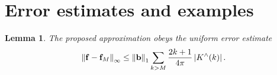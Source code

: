 \documentclass[11pt,a4paper,twoside,bibtotoc]{scrartcl}
\theoremstyle{plain}
\newtheorem{lemma}[theorem]{Lemma}
\theoremstyle{definition}
\theoremstyle{remark}
\newcommand{\abs}[1]{\ensuremath{\left\vert#1\right\vert}}
\newcommand{\fun}[2]{\ensuremath{#1{\hspace{-0.4ex}}\left(#2\right)}}
\newcommand{\mb}[1]{\mathbf{#1}}
\newcommand{\V}[1]{\mb{#1}}
\numberwithin{equation}{section}
\numberwithin{table}{section}
\numberwithin{figure}{section}
\begin{document}
\section{Error estimates and examples}\label{Basics:SphericalKernels}
\begin{lemma}\label{lemma:error}
  The proposed approximation obeys the uniform error estimate
  \begin{equation*}
    \left\|\V{f} - \V{f}_{M}\right\|_{\infty} \le \left\|\V{b}\right\|_1 \sum_{k>M}
    \frac{2k+1}{4\pi} \abs{\fun{K^{\wedge}}{k}}.
  \end{equation*}
\end{lemma}
\end{document}
